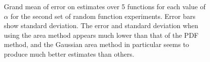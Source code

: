 \documentclass[a4paper,11pt]{article}
\begin{document}
\begin{figure}[]
    \caption{Grand mean of error on estimates over 5 functions for each value of
    $\alpha$ for the second set of random function experiments. Error bars show
    standard deviation. The error and standard deviation when using the area
    method appears much lower than that of the PDF method, and the Gaussian area
    method in particular seems to produce much better estimates than others.}

    \label{fig:moreranderror}
    \end{figure}
\begin{figure}[h]



\end{figure}
\end{document}
